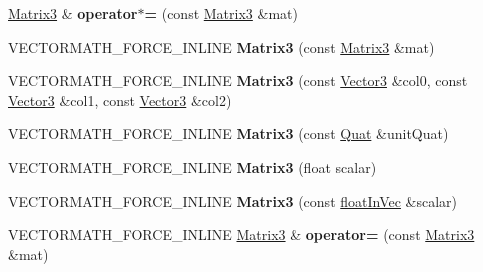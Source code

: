 \begin{DoxyCompactItemize}
\item 
\hypertarget{class_vectormath_1_1_aos_1_1_matrix3_ac41072ce7f3bf177037085ff23671b55}{\hyperlink{class_vectormath_1_1_aos_1_1_matrix3}{Matrix3} \& {\bfseries operator$\ast$=} (const \hyperlink{class_vectormath_1_1_aos_1_1_matrix3}{Matrix3} \&mat)}\label{class_vectormath_1_1_aos_1_1_matrix3_ac41072ce7f3bf177037085ff23671b55}

\item 
\hypertarget{class_vectormath_1_1_aos_1_1_matrix3_a70ed1efea22260aaf3feb09bfdae1cd1}{V\+E\+C\+T\+O\+R\+M\+A\+T\+H\+\_\+\+F\+O\+R\+C\+E\+\_\+\+I\+N\+L\+I\+N\+E {\bfseries Matrix3} (const \hyperlink{class_vectormath_1_1_aos_1_1_matrix3}{Matrix3} \&mat)}\label{class_vectormath_1_1_aos_1_1_matrix3_a70ed1efea22260aaf3feb09bfdae1cd1}

\item 
\hypertarget{class_vectormath_1_1_aos_1_1_matrix3_ae2f8a0046818a2cd2d2c4be443e73cb1}{V\+E\+C\+T\+O\+R\+M\+A\+T\+H\+\_\+\+F\+O\+R\+C\+E\+\_\+\+I\+N\+L\+I\+N\+E {\bfseries Matrix3} (const \hyperlink{class_vectormath_1_1_aos_1_1_vector3}{Vector3} \&col0, const \hyperlink{class_vectormath_1_1_aos_1_1_vector3}{Vector3} \&col1, const \hyperlink{class_vectormath_1_1_aos_1_1_vector3}{Vector3} \&col2)}\label{class_vectormath_1_1_aos_1_1_matrix3_ae2f8a0046818a2cd2d2c4be443e73cb1}

\item 
\hypertarget{class_vectormath_1_1_aos_1_1_matrix3_adc65495cc7d3528f539437ff760aee77}{V\+E\+C\+T\+O\+R\+M\+A\+T\+H\+\_\+\+F\+O\+R\+C\+E\+\_\+\+I\+N\+L\+I\+N\+E {\bfseries Matrix3} (const \hyperlink{class_vectormath_1_1_aos_1_1_quat}{Quat} \&unit\+Quat)}\label{class_vectormath_1_1_aos_1_1_matrix3_adc65495cc7d3528f539437ff760aee77}

\item 
\hypertarget{class_vectormath_1_1_aos_1_1_matrix3_acbf606567d34e43be0b7a90544bd5153}{V\+E\+C\+T\+O\+R\+M\+A\+T\+H\+\_\+\+F\+O\+R\+C\+E\+\_\+\+I\+N\+L\+I\+N\+E {\bfseries Matrix3} (float scalar)}\label{class_vectormath_1_1_aos_1_1_matrix3_acbf606567d34e43be0b7a90544bd5153}

\item 
\hypertarget{class_vectormath_1_1_aos_1_1_matrix3_a81e902638d14176fd5835b14ff2fba8e}{V\+E\+C\+T\+O\+R\+M\+A\+T\+H\+\_\+\+F\+O\+R\+C\+E\+\_\+\+I\+N\+L\+I\+N\+E {\bfseries Matrix3} (const \hyperlink{class_vectormath_1_1float_in_vec}{float\+In\+Vec} \&scalar)}\label{class_vectormath_1_1_aos_1_1_matrix3_a81e902638d14176fd5835b14ff2fba8e}

\item 
\hypertarget{class_vectormath_1_1_aos_1_1_matrix3_a80b68acbbba9f8e8e296cae38a53c35b}{V\+E\+C\+T\+O\+R\+M\+A\+T\+H\+\_\+\+F\+O\+R\+C\+E\+\_\+\+I\+N\+L\+I\+N\+E \hyperlink{class_vectormath_1_1_aos_1_1_matrix3}{Matrix3} \& {\bfseries operator=} (const \hyperlink{class_vectormath_1_1_aos_1_1_matrix3}{Matrix3} \&mat)}\label{class_vectormath_1_1_aos_1_1_matrix3_a80b68acbbba9f8e8e296cae38a53c35b}


\end{DoxyCompactItemize}
